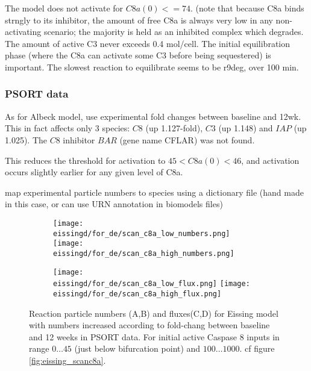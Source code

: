 \documentclass[a4paper,10pt]{report}
\newcommand{\psortbase}{/home/ngrs2/work/bsu/PSORT_Zuliani_Reynolds/}
\newcommand{\apobase}{\psortbase/apoptosis/}
\newcommand{\eissingd}{\apobase/eissing/}
\begin{document}
The model does not activate for $C8a(0) <= 74$. (note that because C8a binds strngly to its inhibitor, the amount of free C8a is always very low in any non-activating scenario; the majority is held as an inhibited complex which degrades.
The amount of active C3 never exceeds 0.4 mol/cell.  The initial equilibration
phase (where the C8a can activate some C3 before being sequestered) is important.
The slowest reaction to equilibrate seems to be r9deg, over 100 min.



\subsubsection{PSORT data}

As for Albeck model, use experimental fold changes between baseline and 12wk. This in fact affects only 3 species: $C8$ (up 1.127-fold), $C3$ (up 1.148) and $IAP$ (up 1.025). The $C8$ inhibitor $BAR$ (gene name CFLAR) was not found.

This reduces the threshold for activation to $45 < C8a(0) < 46$, and activation occurs slightly earlier for any given level of C8a.


map experimental particle numbers to species using a dictionary file
(hand made in this case, or can use URN annotation in biomodels files)


\begin{figure}[h!]
  \begin{subfigure}{\textwidth}
    \subcaptionbox{}
    {\texttt{[image: \\eissingd/for\_de/scan\_c8a\_low\_numbers.png]}}
    \subcaptionbox{}
    {\texttt{[image: \\eissingd/for\_de/scan\_c8a\_high\_numbers.png]}}
  \end{subfigure}
  \begin{subfigure}{\textwidth}
    \subcaptionbox{}
    {\texttt{[image: \\eissingd/for\_de/scan\_c8a\_low\_flux.png]}}
    \subcaptionbox{}
    {\texttt{[image: \\eissingd/for\_de/scan\_c8a\_high\_flux.png]}}
  \end{subfigure}
  \caption{Reaction particle numbers (A,B) and fluxes(C,D) for Eissing model with numbers increased according to fold-chang between baseline and 12 weeks in PSORT data. For initial active Caspase 8 inputs in range $0\ldots45$ (just below bifurcation point) and $100\ldots1000$. cf figure \ref{fig:eissing_scanc8a}.}
  \label{fig:eissing_scanc8a_de}
\end{figure}
\end{document}
